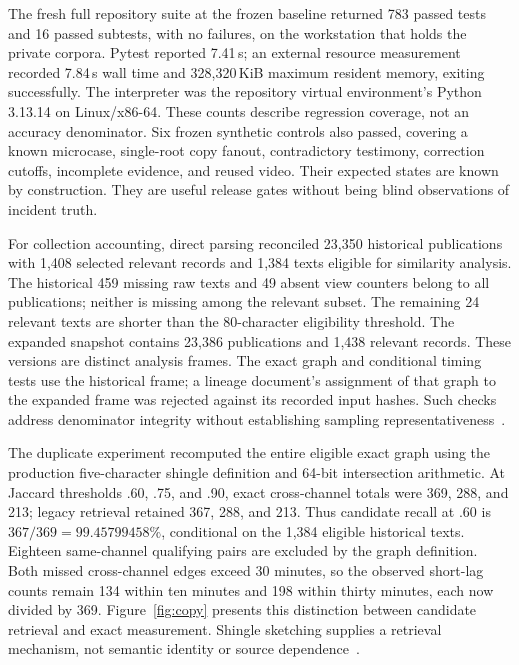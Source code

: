 The fresh full repository suite at the frozen baseline returned 783 passed tests and 16 passed subtests, with no failures, on the workstation that holds the private corpora. Pytest reported 7.41\,s; an external resource measurement recorded 7.84\,s wall time and 328,320\,KiB maximum resident memory, exiting successfully. The interpreter was the repository virtual environment's Python 3.13.14 on Linux/x86-64. These counts describe regression coverage, not an accuracy denominator. Six frozen synthetic controls also passed, covering a known microcase, single-root copy fanout, contradictory testimony, correction cutoffs, incomplete evidence, and reused video. Their expected states are known by construction. They are useful release gates without being blind observations of incident truth.

For collection accounting, direct parsing reconciled 23,350 historical publications with 1,408 selected relevant records and 1,384 texts eligible for similarity analysis. The historical 459 missing raw texts and 49 absent view counters belong to all publications; neither is missing among the relevant subset. The remaining 24 relevant texts are shorter than the 80-character eligibility threshold. The expanded snapshot contains 23,386 publications and 1,438 relevant records. These versions are distinct analysis frames. The exact graph and conditional timing tests use the historical frame; a lineage document's assignment of that graph to the expanded frame was rejected against its recorded input hashes. Such checks address denominator integrity without establishing sampling representativeness~\cite{Olteanu2019,VicentePaula2023}.

The duplicate experiment recomputed the entire eligible exact graph using the production five-character shingle definition and 64-bit intersection arithmetic. At Jaccard thresholds .60, .75, and .90, exact cross-channel totals were 369, 288, and 213; legacy retrieval retained 367, 288, and 213. Thus candidate recall at .60 is $367/369=99.45799458\%$, conditional on the 1,384 eligible historical texts. Eighteen same-channel qualifying pairs are excluded by the graph definition. Both missed cross-channel edges exceed 30 minutes, so the observed short-lag counts remain 134 within ten minutes and 198 within thirty minutes, each now divided by 369. Figure~\ref{fig:copy} presents this distinction between candidate retrieval and exact measurement. Shingle sketching supplies a retrieval mechanism, not semantic identity or source dependence~\cite{Broder1997}.

